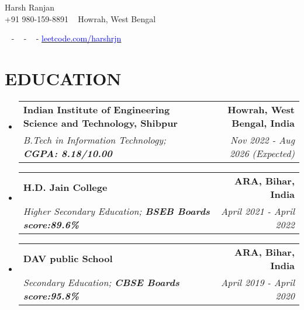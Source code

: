 \documentclass[letterpaper,11pt]{article}
\makeatletter
\newcommand{\resumeSubheading}[4]{
  \vspace{2pt}\item
    \begin{tabular*}{1.0\textwidth}[t]{l@{\extracolsep{\fill}}r}
      \textbf{\large#1} & \textbf{\small #2} \\
      \textit{\large#3} & \textit{\small #4} \\
      
    \end{tabular*}\vspace{-7pt}
}
\newcommand{\resumeSubHeadingListStart}{\begin{itemize}[leftmargin=0.0in, label={}]}
\newcommand{\resumeSubHeadingListEnd}{\end{itemize}}
\makeatother
\begin{document}


\begin{center}
    {\huge Harsh Ranjan} \\ \vspace{2pt} 
    {+91 980-159-8891} ~ 
    \small{ }
     {Howrah, West Bengal} ~ 
   
    
    \href{mailto:shriharshranjangupta@gmail.com}{\color{blue}{shriharshranjangupta@gmail.com}} ~ 
    \small{-}
    \href{https://www.linkedin.com/in/harshrjn/}{ \color{blue}{linkedin.com/in/harshrjn}}  ~
    \small{-}
    \href{https://github.com/Harsh-git98}{ \color{blue}{github.com/Harsh-git98}} ~
     \small{-}
    \href{https://leetcode.com/u/shriharshranjangupta/}{\textcolor{blue}{leetcode.com/harshrjn}} ~
    \vspace{-7pt}
\end{center}

    


\section{\color{airforceblue}EDUCATION}
  \resumeSubHeadingListStart
    \resumeSubheading
      {Indian Institute of Engineering Science and Technology, Shibpur}{Howrah, West Bengal, India}
      {\textit{B.Tech in Information Technology;} \textbf{CGPA: 8.18/10.00}}{Nov 2022 - Aug 2026 (Expected)}
    \vspace{-4pt}
     \resumeSubheading
      {H.D. Jain College}{ARA, Bihar, India}
      {\textit{Higher Secondary Education;} \textbf{BSEB Boards score:89.6\%}}{April 2021 - April 2022}
      \vspace{-4pt}
     \resumeSubheading
      {DAV public School}{ARA, Bihar, India}
      {\textit{Secondary Education;} \textbf{CBSE Boards score:95.8\%}}{April 2019 - April 2020}
  \resumeSubHeadingListEnd
  \vspace{-10pt}
\end{document}
